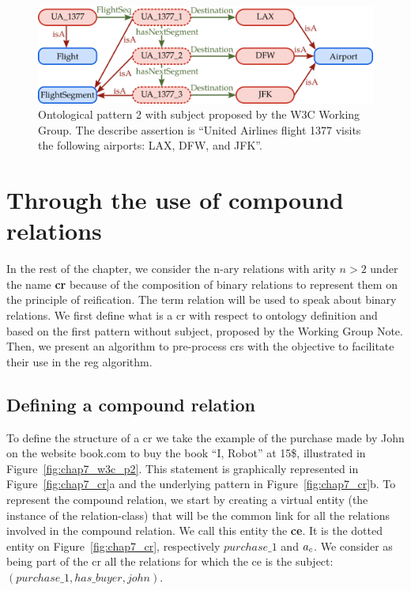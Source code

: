 \begin{figure}[ht!]
\centering
\includegraphics[scale=0.4]{figures/chapter7/w3c_p3.png}
\caption{\label{fig:chap7_w3c_p3} Ontological pattern 2 with subject proposed by the W3C Working Group. The describe assertion is ``United Airlines flight 1377 visits the following airports: LAX, DFW, and JFK''.}
\end{figure}

\section{Through the use of compound relations}

In the rest of the chapter, we consider the n-ary relations with arity $n > 2$ under the name \textbf{\acrfull{cr}} because of the composition of binary relations to represent them on the principle of reification. The term relation will be used to speak about binary relations. We first define what is a \acrshort{cr} with respect to ontology definition and based on the first pattern without subject, proposed by the Working Group Note. Then, we present an algorithm to pre-process \acrfull{cr}s with the objective to facilitate their use in the \acrshort{reg} algorithm.

\subsection{Defining a compound relation}

To define the structure of a \acrlong{cr} we take the example of the purchase made by John on the website book.com to buy the book ``I, Robot'' at 15\$, illustrated in Figure~\ref{fig:chap7_w3c_p2}. This statement is graphically represented in Figure~\ref{fig:chap7_cr}a and the underlying pattern in Figure~\ref{fig:chap7_cr}b. To represent the compound relation, we start by creating a virtual entity (the instance of the relation-class) that will be the common link for all the relations involved in the compound relation. We call this entity the \textbf{\acrfull{ce}}. It is the dotted entity on Figure~\ref{fig:chap7_cr}, respectively $purchase\_1$ and $a_c$. We consider as being part of the \acrshort{cr} all the relations for which the \acrshort{ce} is the subject: $(purchase\_1, has\_buyer, john)$. 

